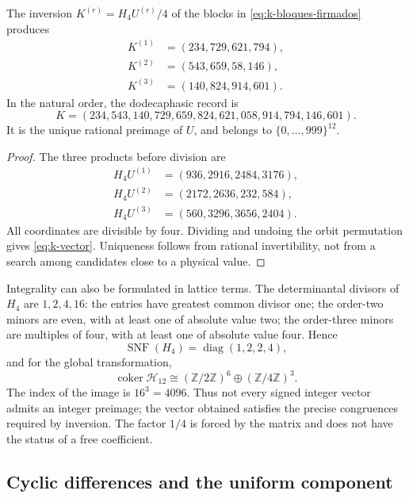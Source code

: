 \begin{proposition}
\label{prop:k-sello}
The inversion \(K^{(r)}=H_4U^{(r)}/4\) of the blocks in
\eqref{eq:k-bloques-firmados} produces
\begin{align*}
 K^{(1)}&=(234,729,621,794),\\
 K^{(2)}&=(543,659,58,146),\\
 K^{(3)}&=(140,824,914,601).
\end{align*}
In the natural order, the dodecaphasic record is
\begin{equation}
 K=(234,543,140,729,659,824,621,058,914,794,146,601).
 \label{eq:k-vector}
\end{equation}
It is the unique rational preimage of \(U\), and belongs to
\(\{0,\ldots,999\}^{12}\).
\end{proposition}

\begin{proof}
The three products before division are
\begin{align*}
 H_4U^{(1)}&=(936,2916,2484,3176),\\
 H_4U^{(2)}&=(2172,2636,232,584),\\
 H_4U^{(3)}&=(560,3296,3656,2404).
\end{align*}
All coordinates are divisible by four. Dividing and undoing the
orbit permutation gives \eqref{eq:k-vector}. Uniqueness follows from
rational invertibility, not from a search among candidates close to
a physical value.
\end{proof}

Integrality can also be formulated in lattice terms. The
determinantal divisors of \(H_4\) are \(1,2,4,16\): the entries
have greatest common divisor one; the order-two minors are even, with
at least one of absolute value two; the order-three minors are multiples of four, with
at least one of absolute value four. Hence
\[
 \operatorname{SNF}(H_4)=\operatorname{diag}(1,2,2,4),
\]
and for the global transformation,
\[
 \operatorname{coker}\mathcal H_{12}
 \cong(\mathbb Z/2\mathbb Z)^6\oplus(\mathbb Z/4\mathbb Z)^3.
\]
The index of the image is \(16^3=4096\). Thus not every signed
integer vector admits an integer preimage; the vector obtained satisfies the
precise congruences required by inversion. The factor \(1/4\) is
forced by the matrix and does not have the status of a free coefficient.

\subsection{Cyclic differences and the uniform component}
\label{subsec:k-transversal}

